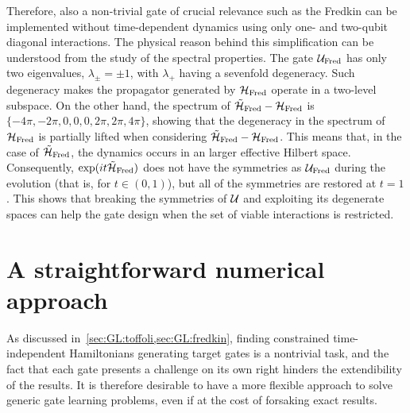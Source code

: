 Therefore, also a non-trivial gate of crucial relevance such as the Fredkin can be implemented without time-dependent dynamics using only one- and two-qubit diagonal interactions.
The physical reason behind this simplification can be understood from the study of the spectral properties.
The gate ${\mathcal{U}}_{\operatorname{Fred}}$ has only two eigenvalues, $\lambda_\pm=\pm1$,
with $\lambda_+$ having a sevenfold degeneracy. Such degeneracy makes the propagator generated by ${\mathcal{H}}_{\operatorname{Fred}}$ operate in a two-level subspace.
On the other hand, the spectrum of $\tilde{{\mathcal{H}}}_{\operatorname{Fred}}-{\mathcal{H}}_{\operatorname{Fred}}$ is $\{{-}4\pi,{-}2\pi,0,0,0,2\pi,2\pi,4\pi\}$, showing that the degeneracy in the spectrum of ${\mathcal{H}}_{\operatorname{Fred}}$ is partially lifted when considering $\tilde{{\mathcal{H}}}_{\operatorname{Fred}}-{\mathcal{H}}_{\operatorname{Fred}}$.
This means that, in the case of $\tilde{{\mathcal{H}}}_{\operatorname{Fred}}$, the dynamics occurs in an larger effective Hilbert space.  %
Consequently, $\exponential(it\HTildeFred)$ does not have the symmetries as ${\mathcal{U}}_{\operatorname{Fred}}$ during the evolution (that is, for $t\in(0,1)$), but all of the symmetries are restored at $t=1$. This  shows that breaking the symmetries of ${\mathcal{U}}$ and exploiting its degenerate spaces can help the gate design when the set of viable interactions is restricted.




\section{A straightforward numerical approach}
\label{sec:GL:numerical_approach}

As discussed in~\cref{sec:GL:toffoli,sec:GL:fredkin}, finding constrained time-independent Hamiltonians generating target gates is a nontrivial task,
and the fact that each gate presents a challenge on its own right hinders the extendibility of the results.
It is therefore desirable to have a more flexible approach to solve generic gate learning problems, even if at the cost of forsaking exact results.

